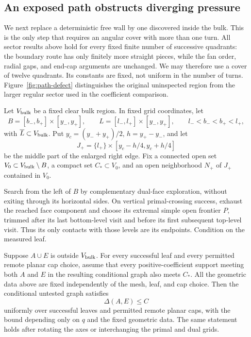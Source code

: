 \subsection{An exposed path obstructs diverging pressure}
\label{sector:path-defect-subsection}

We next replace a deterministic free wall by one discovered inside
the bulk.  This is the only step that requires an angular cover with
more than one turn.  All sector results above hold for every fixed
finite number of successive quadrants: the boundary route has only
finitely more straight pieces, while the fan order, radial gaps, and
end-cap arguments are unchanged.  We may therefore use a cover of
twelve quadrants.  Its constants are fixed, not uniform in the number
of turns.  Figure~\ref{fig:path-defect} distinguishes the original
uninspected region from the larger regular sector used in the
coefficient comparison.

\begin{lemma}
\label{lem:sector:path-defect}
Let $V_{\rm bulk}$ be a fixed clear bulk region.  In fixed grid
coordinates, let
\[
 B=[b_-,b_+]\times[y_-,y_+],\qquad
 L=[l_-,l_+]\times[y_-,y_+],
 \qquad l_-<b_-<b_+<l_+,
\]
with $\overline L\subset V_{\rm bulk}$.  Put
$y_c=(y_-+y_+)/2$, $h=y_+-y_-$, and let
\[
 J_+=\{l_+\}\times[y_c-h/4,y_c+h/4]
\]
be the middle part of the enlarged right edge.  Fix a connected open
set $V_0\subset V_{\rm bulk}\setminus B$, a compact set $C_*\subset V_0$,
and an open neighborhood $N_+$ of $J_+$ contained in $V_0$.

Search from the left of $B$ by complementary
dual-face exploration, without exiting through its horizontal sides.
On vertical primal-crossing success, exhaust the reached face
component and choose its extremal simple open frontier $P$, trimmed
after its last bottom-level visit and before its first subsequent
top-level visit.  Thus its only contacts with those levels are its
endpoints.  Condition on the measured leaf.

Suppose $A\cup E$ is outside $V_{\rm bulk}$.  For every successful
leaf and every permitted remote planar cap choice, assume that every
positive-coefficient support meeting both $A$ and $E$ in the resulting
conditional graph also meets $C_*$.  All the geometric data above are
fixed independently of the mesh, leaf, and cap choice.  Then the
conditional untested graph satisfies
\begin{equation}
 \Delta(A,E)\le C
 \label{sector:path-defect-bound}
\end{equation}
uniformly over successful leaves and permitted remote planar caps,
with the bound depending only on $q$ and the fixed geometric data.
The same statement holds after rotating the axes or interchanging
the primal and dual grids.
\end{lemma}

